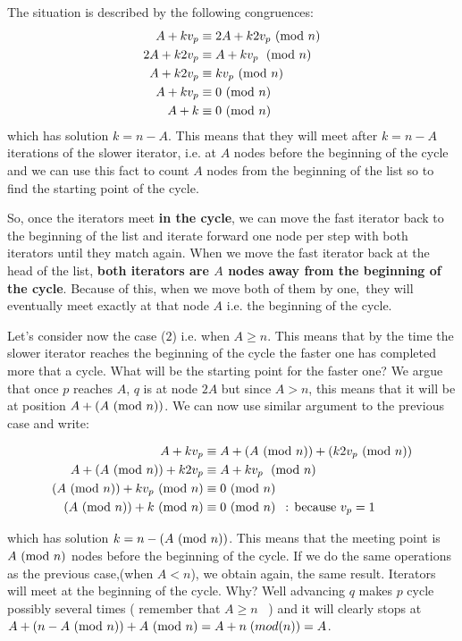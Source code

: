 The situation is described by the following congruences:
\begin{align}
  A + kv_p &\equiv 2A + k2v_p \ (\mathrm{mod}\ n) \\
  2A + k2v_p &\equiv A + kv_p \;  \ (\mathrm{mod}\ n) \\
  A + k2v_p &\equiv kv_p   \ (\mathrm{mod}\ n) \\
  A +kv_p &\equiv 0   \ (\mathrm{mod}\ n) \\
  A +k &\equiv 0  \ (\mathrm{mod}\ n)
\end{align}
which has solution \(k = n-A\). This means that they will meet after \(k=n-A\) iterations of the
slower iterator, i.e. at \(A\) nodes before the beginning of the cycle and we can use this fact to
count \(A\) nodes from the beginning of the list so to find the starting point of the cycle. 

So, once the iterators meet \textbf{in the cycle}, we can move the fast iterator back to the
beginning of the list and iterate forward one node per step with both iterators until they match
again. When we move the fast iterator back at the head of the list, \textbf{both iterators are \(A\)
nodes away from the beginning of the cycle}. Because of this, when we move both of them by one, they
will eventually meet exactly at that node \(A\) i.e. the beginning of the cycle.


Let's consider now the case ($2$) i.e.  when \(A \geq n\). This means that by the time the slower
iterator reaches the beginning of the cycle the faster one has completed more that a cycle. What
will be the starting point for the faster one? We argue that once \(p\) reaches \(A\), \(q\) is at
node \(2A\) but since \(A > n\), this means that it will be at position \(A + (A \ (\mathrm{mod}\ n))\). We can
now use similar argument to the previous case and write:

\begin{align}
  A + kv_p &\equiv A + (A \ (\mathrm{mod}\ n)) + (k2v_p \ (\mathrm{mod}\ n)) \\
  A + (A \ (\mathrm{mod}\ n)) + k2v_p &\equiv A + kv_p\;\ (\mathrm{mod}\ n) \\
  (A \ (\mathrm{mod}\ n)) + kv_p \ (\mathrm{mod}\ n) & \equiv 0\ (\mathrm{mod}\ n) \\
  (A \ (\mathrm{mod}\ n)) + k \ (\mathrm{mod}\ n) &\equiv 0 \ (\mathrm{mod}\ n) \: \: \text{  : because  } v_p=1 \\
\end{align}


which has solution \(k = n-(A \ (\mathrm{mod}\ n))\). This means that the meeting point is \(A \ (\mathrm{mod}\ n)\) nodes
before the beginning of the cycle. If we do the same operations as the previous case,(when \(A <
n\)), we obtain again, the same result. Iterators will meet at the beginning of the cycle. Why? Well
advancing \(q\) makes \(p\) cycle possibly several times ( remember that \(A \geq n\)  ) and it will
clearly stops at \( A+(n-A \ (\mathrm{mod}\ n)) + A \ (\mathrm{mod}\ n) = A +n \;(mod (n))= A\).


